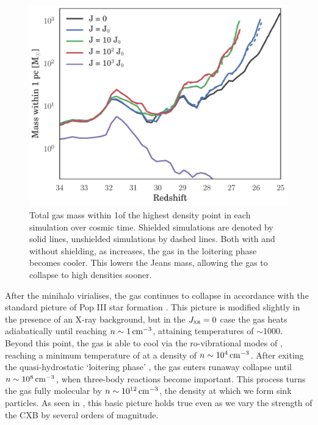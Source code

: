 \documentclass[../thesis.tex]{subfiles}
\begin{document}
\begin{figure}
  \begin{center}
    \includegraphics[width=\columnwidth]{figures/growth/collapse}
    \caption{Total gas mass within 1\pc of the highest density point in each simulation over cosmic time. Shielded simulations are denoted by solid lines, unshielded simulations by dashed lines.  Both with and without shielding, as \jxr increases, the gas in the loitering phase becomes cooler. This lowers the Jeans mass, allowing the gas to collapse to high densities sooner.}
    \label{fig:collapse}
  \end{center}
\end{figure}

After the minihalo virialises, the gas continues to collapse in accordance with the standard picture of Pop III star formation \citep[e.g.,][]{StacyGreifBromm2010, Greifetal2012, StacyBromm2013}. This picture is modified slightly in the presence of an X-ray background, but in the $J_{\textsc{xr}}=0$ case the gas heats adiabatically until reaching $n\sim1\,\mathrm{cm}^{-3}$, attaining temperatures of $\sim$1000\kelvin. Beyond this point, the gas is able to cool via the ro-vibrational modes of \htwo, reaching a minimum temperature of \kelvin at a density of $n\sim10^4\,\mathrm{cm}^{-3}$.  After exiting the quasi-hydrostatic `loitering phase' \citep{BrommCoppiLarson2002}, the gas enters runaway collapse until $n\sim10^8\,\mathrm{cm}^{-3}$, when three-body reactions become important.  This process turns the gas fully molecular by $n\sim10^{12}\,\mathrm{cm}^{-3}$, the density at which we form sink particles. As seen in , this basic picture holds true even as we vary the strength of the CXB by several orders of magnitude. 
\end{document}
